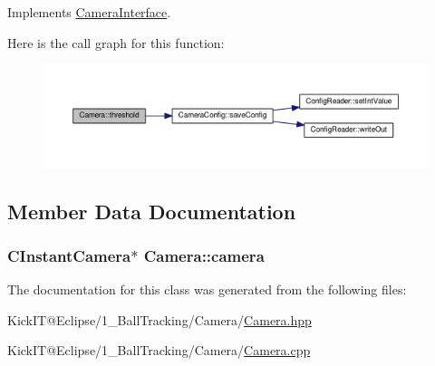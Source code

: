 Implements \hyperlink{class_camera_interface_ae0181e4f80b465dfdf5971175fd0c497}{Camera\+Interface}.



Here is the call graph for this function\+:\nopagebreak
\begin{figure}[H]
\begin{center}
\leavevmode
\includegraphics[width=350pt]{class_camera_ad4553e7cd83dba29a3d0b1542e28c66e_cgraph}
\end{center}
\end{figure}




\subsection{Member Data Documentation}
\subsubsection[{\texorpdfstring{camera}{camera}}]{\setlength{\rightskip}{0pt plus 5cm}C\+Instant\+Camera$\ast$ Camera\+::camera\hspace{0.3cm}{\ttfamily [protected]}}\hypertarget{class_camera_ade18caead38b42ad3ea4ca3816452996}{}\label{class_camera_ade18caead38b42ad3ea4ca3816452996}


The documentation for this class was generated from the following files\+:\begin{DoxyCompactItemize}
\item 
Kick\+I\+T@\+Eclipse/1\+\_\+\+Ball\+Tracking/\+Camera/\hyperlink{_camera_8hpp}{Camera.\+hpp}\item 
Kick\+I\+T@\+Eclipse/1\+\_\+\+Ball\+Tracking/\+Camera/\hyperlink{_camera_8cpp}{Camera.\+cpp}\end{DoxyCompactItemize}
